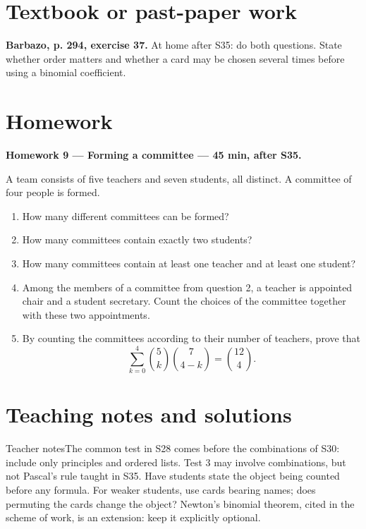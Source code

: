 \section{Textbook or past-paper work}\textbf{Barbazo, p. 294, exercise 37.} At home after S35: do both questions. State whether order matters and whether a card may be chosen several times before using a binomial coefficient.

\section{Homework}\textbf{Homework 9 --- Forming a committee --- 45 min, after S35.}\par A team consists of five teachers and seven students, all distinct. A committee of four people is formed.
\begin{enumerate}\item How many different committees can be formed?
\item How many committees contain exactly two students?
\item How many committees contain at least one teacher and at least one student?
\item Among the members of a committee from question 2, a teacher is appointed chair and a student secretary. Count the choices of the committee together with these two appointments.
\item By counting the committees according to their number of teachers, prove that \[\sum_{k=0}^4\binom5k\binom7{4-k}=\binom{12}4.\]\end{enumerate}

\ifprof\clearpage\section{Teaching notes and solutions}\begin{profbox}{Teacher notes}The common test in S28 comes before the combinations of S30: include only principles and ordered lists. Test 3 may involve combinations, but not Pascal's rule taught in S35. Have students state the object being counted before any formula. For weaker students, use cards bearing names; does permuting the cards change the object? Newton's binomial theorem, cited in the scheme of work, is an extension: keep it explicitly optional.\end{profbox}

